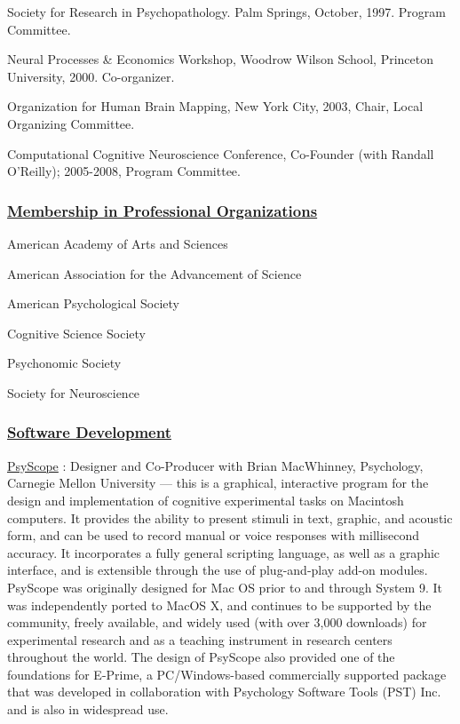\documentclass[10 pt]{article}
\begin{document}
Society for Research in Psychopathology. Palm Springs, October, 1997. Program Committee.

Neural Processes \& Economics Workshop, Woodrow Wilson School, Princeton University, 2000. Co-organizer.

Organization for Human Brain Mapping, New York City, 2003, Chair, Local Organizing Committee.

Computational Cognitive Neuroscience Conference, Co-Founder (with Randall O’Reilly); 2005-2008, Program Committee.


\subsubsection*{\underline{Membership in Professional Organizations}} \label{secMiPO}
    \smallskip

American Academy of Arts and Sciences

American Association for the Advancement of Science

American Psychological Society

Cognitive Science Society

Psychonomic Society

Society for Neuroscience


\subsubsection*{\underline{Software Development}} \label{secSD}
    \smallskip

\href{https://en.wikipedia.org/wiki/PsyScope}{PsyScope} \cite{cohen1993psyscope}: Designer and Co-Producer with Brian MacWhinney, Psychology, Carnegie Mellon University — this is a graphical, interactive program for the design and implementation of cognitive experimental tasks on Macintosh computers. It provides the ability to present stimuli in text, graphic, and acoustic form, and can be used to record manual or voice responses with millisecond accuracy. It incorporates a fully general scripting language, as well as a graphic interface, and is extensible through the use of plug-and-play add-on modules. PsyScope was originally designed for Mac OS prior to and through System 9. It was independently ported to MacOS X, and continues to be supported by the community, freely available, and widely used (with over 3,000 downloads) for experimental research and as a teaching instrument in research centers throughout the world. The design of PsyScope also provided one of the foundations for E-Prime, a PC/Windows-based commercially supported package that was developed in collaboration with Psychology Software Tools (PST) Inc. and is also in
widespread use.
    \smallskip
\end{document}
